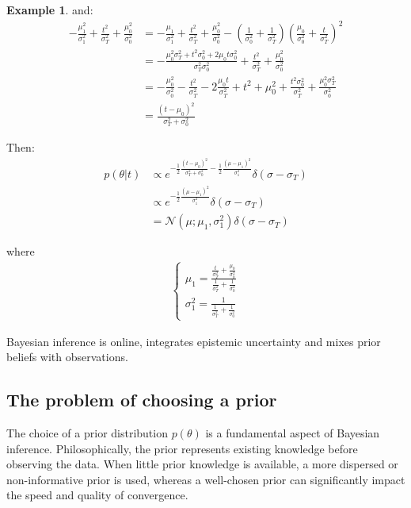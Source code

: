 \documentclass[12pt, a4paper]{article}
\theoremstyle{definition}
\newtheorem{example}{Example}[section]
\numberwithin{figure}{section}
\numberwithin{equation}{section}
\numberwithin{table}{section}
\begin{document}
\begin{example}
and:
\begin{align}
- \frac{\mu_1^2}{\sigma_1^2} + \frac{t^2}{\sigma_T^2} + \frac{\mu_0^2}{\sigma_0^2}
&= - \frac{\mu_1}{\sigma_1^2} + \frac{t^2}{\sigma_T^2} + \frac{\mu_0^2}{\sigma_0^2} - \left( \frac{1}{\sigma_0^2} + \frac{1}{\sigma_T^2} \right) \left( \frac{\mu_0}{\sigma_0^2} + \frac{t}{\sigma_T^2} \right)^2\\
&= - \frac{\mu_0^2 \sigma_T^2 + t^2 \sigma_0^2 + 2\mu_0 t \sigma_0^2}{\sigma_T^2 \sigma_0^2} + \frac{t^2}{\sigma_T^2} + \frac{\mu_0^2}{\sigma_0^2}\\
&= - \frac{\mu_0^2}{\sigma_0^2} - \frac{t^2}{\sigma_T^2} - 2\frac{\mu_0 t}{\sigma_T^2} + t^2 + \mu_0^2 + \frac{t^2 \sigma_0^2}{\sigma_T^2} + \frac{\mu_0^2 \sigma_T^2}{\sigma_0^2}\\
&= \frac{(t - \mu_0)^2}{\sigma_T^2 + \sigma_0^2}
\end{align}

Then:
\begin{align}
p(\theta | t)
&\propto e^{-\frac{1}{2}\frac{(t - \mu_0)^2}{\sigma_T^2 + \sigma_0^2} - \frac{1}{2}\frac{(\mu - \mu_1)^2}{\sigma_1^2}}\delta(\sigma - \sigma_T)\\
&\propto e^{- \frac{1}{2}\frac{(\mu - \mu_1)^2}{\sigma_1^2}}\delta(\sigma - \sigma_T)\\
&=\mathcal{N}(\mu; \mu_1, \sigma_1^2) \delta(\sigma - \sigma_T)
\end{align}

where
\begin{align}
\left\{
\begin{array}{l}
\mu_1=\frac{\frac{t}{\sigma_T^2} + \frac{\mu_0}{\sigma_0^2}}{\frac{1}{\sigma_T^2} + \frac{1}{\sigma_0^2}} \\ [1em]
\sigma_1^2=\frac{1}{\frac{1}{\sigma_T^2} + \frac{1}{\sigma_0^2}}
\end{array}
\right.
\end{align}
\end{example}

Bayesian inference is online, integrates epistemic uncertainty and mixes prior beliefs with observations.

\subsection{The problem of choosing a prior}

The choice of a prior distribution $p(\theta)$ is a fundamental aspect of Bayesian inference. Philosophically, the prior represents existing knowledge before observing the data. When little prior knowledge is available, a more dispersed or non-informative prior is used, whereas a well-chosen prior can significantly impact the speed and quality of convergence.
\end{document}
